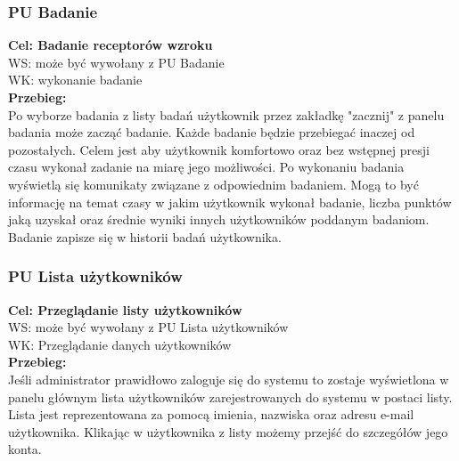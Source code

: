 \documentclass[12pt, letterpaper]{article}
\begin{document}
		\subsubsection{PU Badanie}
		
		\quad
		
		\textbf{Cel: Badanie receptorów wzroku}\\
		
		WS: może być wywołany z PU Badanie\\
		
		WK: wykonanie badanie \\
		
		\textbf{Przebieg:}\\
		Po wyborze badania z listy badań użytkownik przez zakładkę "zacznij" z panelu badania może zacząć badanie. Każde badanie będzie przebiegać inaczej od pozostałych. Celem jest aby użytkownik komfortowo oraz bez wstępnej presji czasu wykonał zadanie na miarę jego możliwości. Po wykonaniu badania wyświetlą się komunikaty związane z odpowiednim badaniem. Mogą to być informację na temat czasy w jakim użytkownik wykonał badanie, liczba punktów jaką uzyskał oraz średnie wyniki innych użytkowników poddanym badaniom. Badanie zapisze się w historii badań użytkownika. \\	
		
		
		\subsubsection{PU Lista użytkowników}
		
		\quad
		
		\textbf{Cel: Przeglądanie listy użytkowników}\\
		
		WS: może być wywołany z PU Lista użytkowników\\
		
		WK: Przeglądanie danych użytkowników \\
		
		\textbf{Przebieg:}\\
		Jeśli administrator prawidłowo zaloguje się do systemu to zostaje wyświetlona w panelu głównym lista użytkowników zarejestrowanych do systemu w postaci listy. Lista jest reprezentowana za pomocą imienia, nazwiska oraz adresu e-mail użytkownika. Klikając w użytkownika z listy możemy przejść do szczegółów jego konta.\\	
		
\end{document}
